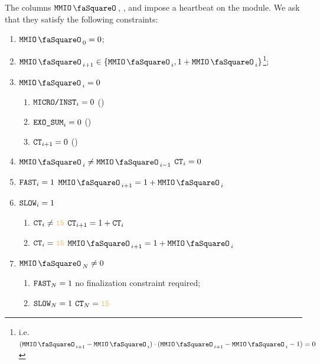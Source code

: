 The columns $\mmioStamp$, \fastOp{}, \slowOp{} and \ct{} impose a heartbeat on the \mmioMod{} module. We ask that they satisfy the following constraints:
\begin{enumerate}
	\item $\mmioStamp_{0} = 0$;
	\item $\mmioStamp_{i+1}\in\{\mmioStamp_{i}, 1+\mmioStamp_{i}\}$\footnote{i.e. $(\mmioStamp_{i+1}-\mmioStamp_{i})\cdot(\mmioStamp_{i+1}-\mmioStamp_{i}-1)=0$};
	\item \If $\mmioStamp_{i} = 0$ \Then
	\begin{enumerate}
		\item $\texttt{MICRO}\texttt{/}{\texttt{INST}}_{i}=0$ \quad (\trash)
		\item $\texttt{EXO\_SUM}_{i}=0$ \quad (\trash)
		\item $\texttt{CT}_{i+1} = 0$ \quad (\trash)
	\end{enumerate}
	\item \If $\mmioStamp_{i} \neq \mmioStamp_{i - 1}$ \Then $\texttt{CT}_{i}=0$
	\item \If $\texttt{FAST}_{i} = 1$ \Then $\mmioStamp_{i+1} =  1 + \mmioStamp_{i}$
	\item \If $\texttt{SLOW}_{i} = 1$ \Then
	\begin{enumerate}
		\item \If $\ct_{i} \neq \llargeMO$ \Then $\texttt{CT}_{i+1} = 1 + \texttt{CT}_{i}$
		\item \If $\ct_{i} = \llargeMO$ \Then $\mmioStamp_{i+1} =  1 + \mmioStamp_{i}$
	\end{enumerate}
	\item \If $\mmioStamp_N \neq 0$ \Then
	\begin{enumerate}
		\item \If $\texttt{FAST}_{N} = 1$ no finalization constraint required;
		\item \If $\texttt{SLOW}_{N} = 1$ \Then $\ct_{N} = \llargeMO$
	\end{enumerate}
\end{enumerate}
